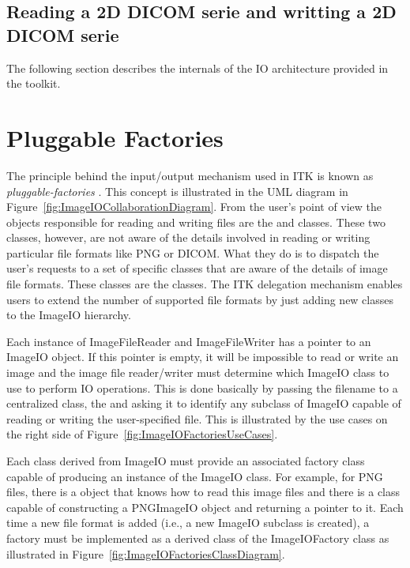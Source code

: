 \subsection{Reading a 2D DICOM serie and writting a 2D DICOM serie}




The following section describes the internals of the IO architecture provided
in the toolkit.

\section{Pluggable Factories}
\label{sec:ImageIOPluggableFactories}

The principle behind the input/output mechanism used in ITK is known as
\emph{pluggable-factories} \cite{Gamma1995}. This concept is illustrated in
the UML diagram in Figure~\ref{fig:ImageIOCollaborationDiagram}. From the
user's point of view the objects responsible for reading and writing files
are the  and 
classes. These two classes, however, are not aware of the details involved in
reading or writing particular file formats like PNG or DICOM.  What they do
is to dispatch the user's requests to a set of specific classes that are
aware of the details of image file formats. These classes are the
 classes. The ITK delegation mechanism enables users to
extend the number of supported file formats by just adding new classes to the
ImageIO hierarchy.

Each instance of ImageFileReader and ImageFileWriter has
a pointer to an ImageIO object. If this pointer is empty, it will
be impossible to read or write an image and the image file reader/writer must
determine which ImageIO class to use to perform IO operations.
This is done basically by passing the filename to a centralized class, the
 and asking it to identify any subclass of
ImageIO capable of reading or writing the user-specified file. This
is illustrated by the use cases on the right side of
Figure~\ref{fig:ImageIOFactoriesUseCases}.

Each class derived from ImageIO must provide an associated factory
class capable of producing an instance of the ImageIO class. For
example, for PNG files, there is a  object that knows how
to read this image files and there is a  class
capable of constructing a PNGImageIO object and returning a pointer
to it.  Each time a new file format is added (i.e., a new ImageIO
subclass is created), a factory must be implemented as a derived class of the
ImageIOFactory class as illustrated in
Figure~\ref{fig:ImageIOFactoriesClassDiagram}.

